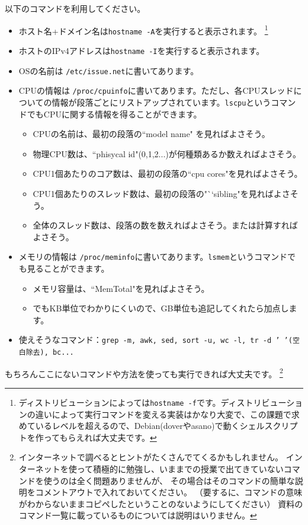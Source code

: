\documentclass[a4j]{ltjsreport}
\begin{document}
    以下のコマンドを利用してください。
    \begin{itemize}
        \item ホスト名+ドメイン名は\texttt{hostname -A}を実行すると表示されます。
        \footnote{ディストリビューションによっては\texttt{hostname -f}です。ディストリビューションの違いによって実行コマンドを変える実装はかなり大変で、この課題で求めているレベルを超えるので、Debian(doverやasano)で動くシェルスクリプトを作ってもらえれば大丈夫です。}
        \item ホストのIPv4アドレスは\texttt{hostname -I}を実行すると表示されます。
        \item OSの名前は \verb|/etc/issue.net|に書いてあります。
        \item CPUの情報は \verb|/proc/cpuinfo|に書いてあります。ただし、各CPUスレッドについての情報が段落ごとにリストアップされています。\verb+lscpu+というコマンドでもCPUに関する情報を得ることができます。
        \begin{itemize} 
            \item CPUの名前は、最初の段落の``model name" を見ればよさそう。
            \item 物理CPU数は、``phisycal id"(0,1,2...)が何種類あるか数えればよさそう。
            \item CPU1個あたりのコア数は、最初の段落の``cpu cores"を見ればよさそう。
            \item CPU1個あたりのスレッド数は、最初の段落の"``sibling"を見ればよさそう。
            \item 全体のスレッド数は、段落の数を数えればよさそう。または計算すればよさそう。
        \end{itemize}
        \item メモリの情報は \verb|/proc/meminfo|に書いてあります。\verb+lsmem+というコマンドでも見ることができます。
        \begin{itemize}
            \item メモリ容量は、``MemTotal"を見ればよさそう。
            \item でもKB単位でわかりにくいので、GB単位も追記してくれたら加点します。
        \end{itemize}
        \item 使えそうなコマンド：\texttt{grep -m, awk, sed, sort -u, wc -l, tr -d ' '(空白除去), bc...}
    \end{itemize}
    もちろんここにないコマンドや方法を使っても実行できれば大丈夫です。
    \footnote{インターネットで調べるとヒントがたくさんでてくるかもしれません。
    インターネットを使って積極的に勉強し、いままでの授業で出てきていないコマンドを使うのは全く問題ありませんが、
    その場合はそのコマンドの簡単な説明をコメントアウトで入れておいてください。
    （要するに、コマンドの意味がわからないままコピペしたということのないようにしてください）
    資料のコマンド一覧に載っているものについては説明はいりません。}
\end{document}
